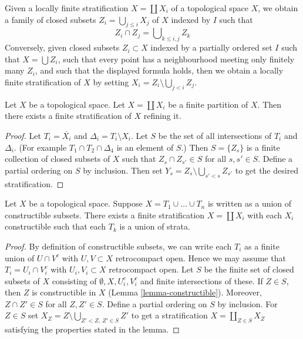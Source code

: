 \begin{remark}
\label{remark-locally-finite-stratification}
Given a locally finite stratification $X = \coprod X_i$ of a
topological space $X$, we obtain a family of closed subsets
$Z_i = \bigcup_{j \leq i} X_j$ of $X$ indexed by $I$ such that
$$
Z_i \cap Z_j = \bigcup\nolimits_{k \leq i, j} Z_k
$$
Conversely, given closed subsets $Z_i \subset X$ indexed by a
partially ordered set $I$ such that $X = \bigcup Z_i$, such that every point
has a neighbourhood meeting only finitely many $Z_i$, and such that
the displayed formula holds, then we obtain a locally finite
stratification of $X$ by setting $X_i = Z_i \setminus \bigcup_{j < i} Z_j$.
\end{remark}

\begin{lemma}
\label{lemma-partition-refined-by-stratification}
Let $X$ be a topological space. Let $X = \coprod X_i$ be a finite partition
of $X$. Then there exists a finite stratification of $X$ refining it.
\end{lemma}

\begin{proof}
Let $T_i = \overline{X_i}$ and $\Delta_i = T_i \setminus X_i$.
Let $S$ be the set of all intersections of $T_i$ and $\Delta_i$.
(For example $T_1 \cap T_2 \cap \Delta_4$ is an element of $S$.)
Then $S = \{Z_s\}$ is a finite collection of closed subsets of $X$ such that
$Z_s \cap Z_{s'} \in S$ for all $s, s' \in S$. Define a partial ordering
on $S$ by inclusion. Then set $Y_s = Z_s \setminus \bigcup_{s' < s} Z_{s'}$
to get the desired stratification.
\end{proof}

\begin{lemma}
\label{lemma-constructible-partition-refined-by-stratification}
Let $X$ be a topological space. Suppose $X = T_1 \cup \ldots \cup T_n$
is written as a union of constructible subsets. There exists a finite
stratification $X = \coprod X_i$ with each $X_i$ constructible
such that each $T_k$ is a union of strata.
\end{lemma}

\begin{proof}
By definition of constructible subsets, we can write each $T_i$ as a
finite union of $U \cap V^c$ with $U, V \subset X$ retrocompact open.
Hence we may assume that $T_i = U_i \cap V_i^c$
with $U_i, V_i \subset X$ retrocompact open. Let $S$ be the
finite set of closed subsets of $X$ consisting of
$\emptyset, X, U_i^c, V_i^c$ and finite intersections of these.
If $Z \in S$, then $Z$ is constructible in $X$
(Lemma \ref{lemma-constructible}).
Moreover, $Z \cap Z' \in S$ for all $Z, Z' \in S$.
Define a partial ordering on $S$ by inclusion. For $Z \in S$ set
$X_Z = Z \setminus \bigcup_{Z' < Z,\ Z' \in S} Z'$
to get a stratification $X = \coprod_{Z \in S} X_Z$
satisfying the properties stated in the lemma.
\end{proof}

